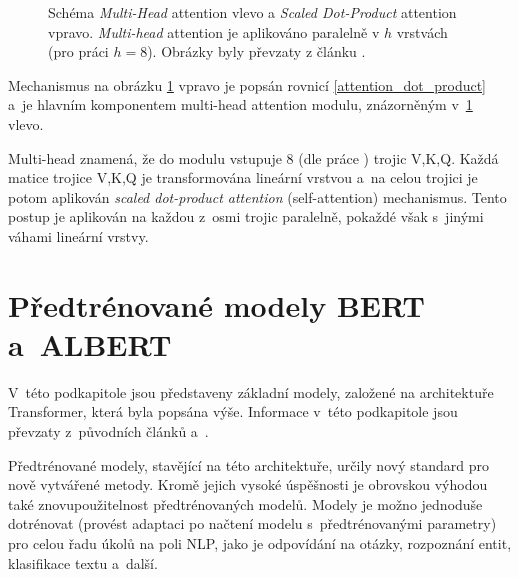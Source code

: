 \begin{figure}[hbt]
    \centering
	\caption{Schéma \emph{Multi-Head} attention vlevo a \emph{Scaled Dot-Product} attention vpravo. \emph{Multi-head} attention je aplikováno paralelně v $h$ vrstvách (pro práci \cite{Transformers} $h=8$). Obrázky byly převzaty z článku \cite{Transformers}.}
	\label{multihead}
\end{figure}

Mechanismus na obrázku \ref{multihead} vpravo je popsán rovnicí \ref{attention_dot_product} a~je hlavním komponentem multi-head attention modulu, znázorněným v~\ref{multihead} vlevo.\par
Multi-head znamená, že do modulu vstupuje 8 (dle práce \cite{Transformers}) trojic V,K,Q. Každá matice trojice V,K,Q je transformována lineární vrstvou a~na celou trojici je potom aplikován \emph{scaled dot-product attention} (self-attention) mechanismus. Tento postup je aplikován na každou z~osmi trojic paralelně, pokaždé však s~jinými váhami lineární vrstvy.

\section{Předtrénované modely BERT a~ALBERT}
\label{bert_albert}

V~této podkapitole jsou představeny základní modely, založené na architektuře Transformer, která byla popsána výše. Informace v~této podkapitole  jsou převzaty z~původních článků \cite{BERT} a~\cite{ALBERT}.\par
Předtrénované modely, stavějící na této architektuře, určily nový standard pro nově vytvářené metody. Kromě jejich vysoké úspěšnosti je obrovskou výhodou také znovupoužitelnost předtrénovaných modelů. Modely je možno jednoduše dotrénovat (provést adaptaci po načtení modelu s~předtrénovanými parametry) pro celou řadu úkolů na poli NLP, jako je odpovídání na otázky, rozpoznání entit, klasifikace textu a~další.

